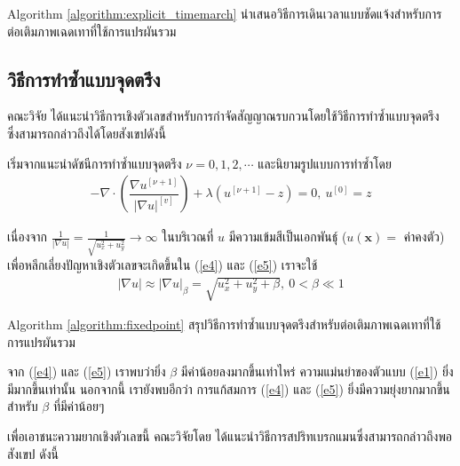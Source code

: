  \vspace{0.5cm} \hspace{1cm} Algorithm \ref{algorithm:explicit_timemarch} นำเสนอวิธีการเดินเวลาแบบชัดแจ้งสำหรับการต่อเติมภาพเฉดเทาที่ใช้การแปรผันรวม \\
 


\subsection{วิธีการทำซ้ำแบบจุดตรึง}

\hspace{1cm} คณะวิจัย \cite{ref:FixpointSolver} ได้แนะนำวิธีการเชิงตัวเลขสำหรับการกำจัดสัญญาณรบกวนโดยใช้วิธีการทำซ้ำแบบจุดตรึง ซึ่งสามารถกล่าวถึงได้โดยสังเขปดังนี้
	
\hspace{1cm} เริ่มจากแนะนำดัชนีการทำซ้ำแบบจุดตรึง $\nu=0,1,2,\cdots$ และนิยามรูปแบบการทำซ้ำโดย
\begin{align}
	- \nabla\cdot\left(\dfrac{\nabla u^{[\nu+1]}}{{| \nabla u |}^{[v]} }\right) + \lambda(u^{[\nu+1]}-z)  = 0,\ u^{[0]}=z
	\label{e5}
\end{align}

\hspace{1cm} เนื่องจาก $\tfrac{1}{| \nabla u |}=\tfrac{1}{\sqrt{u_x^2+u_y^2}} \rightarrow \infty$ ในบริเวณที่ $u$ มีความเข้มสีเป็นเอกพันธ์ุ ($u(\mathbf{x})=$ ค่าคงตัว) เพื่อหลีกเลี่ยงปัญหาเชิงตัวเลขจะเกิดขึ้นใน (\ref{e4}) และ (\ref{e5}) เราจะใช้ 
\begin{align*}
|\nabla u| \approx| \nabla u |_\beta=\sqrt{u_x^2+u_y^2+\beta},\ 0< \beta \ll 1
 \end{align*}

\hspace{1cm} Algorithm \ref{algorithm:fixedpoint} สรุปวิธีการทำซ้ำแบบจุดตรึงสำหรับต่อเติมภาพเฉดเทาที่ใช้การแปรผันรวม \\
\vspace{0.5cm} 

\vspace{0.5cm}
\hspace{1cm} จาก (\ref{e4}) และ (\ref{e5}) เราพบว่ายิ่ง $\beta$ มีค่าน้อยลงมากขึ้นเท่าไหร่ ความแม่นยำของตัวแบบ (\ref{e1}) ยิ่งมีมากขึ้นเท่านั้น นอกจากนี้ เรายังพบอีกว่า การแก้สมการ (\ref{e4}) และ (\ref{e5}) ยิ่งมีความยุ่งยากมากขึ้นสำหรับ $\beta$ ที่มีค่าน้อยๆ 

\hspace{1cm} เพื่อเอาชนะความยากเชิงตัวเลขนี้ คณะวิจัยโดย \cite{ref:splitbergman-inpaint} ได้แนะนำวิธีการสปริทเบรกแมนซึ่งสามารถกล่าวถึงพอสังเขป ดังนี้

